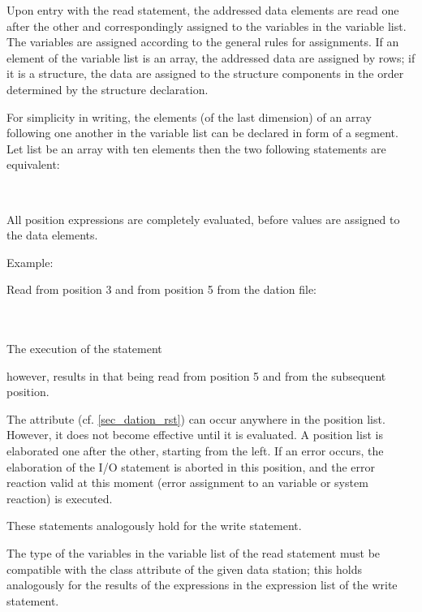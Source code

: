 Upon entry with the read statement, the addressed data elements are
read one after the other and correspondingly assigned to the variables
in the variable list. The variables are assigned according to the
general rules for assignments. If an element of the variable list is an
array, the addressed data are assigned by rows; if it is a structure, the
data are assigned to the structure components in the order determined by
the structure declaration.

For simplicity in writing, the elements (of the last dimension) of an
array following one another in the variable list can be declared in form
of a segment. Let list be an array with ten elements  then the two following statements are equivalent:

\\

All position expressions are completely evaluated, before values are
assigned to the data elements.

Example:

Read  from position 3 and  from position 5 from the dation file:

\\
\\

The execution of the statement


however, results in that  being read from position 5 and  from the
subsequent position.

The  attribute (cf. \ref{sec_dation_rst}) can occur anywhere in the
 position list.
However, it does not become effective until it is evaluated. A position
list is elaborated one after the other, starting from the left. If an
error occurs, the elaboration of the I/O statement is aborted in this
position, and the error reaction valid at this moment (error assignment
to an  variable or system reaction) is executed.

These statements analogously hold for the write statement.

The type of the variables in the variable list of the read statement
must be compatible with the class attribute of the given data station;
this holds analogously for the results of the expressions in the
expression list of the write statement.


